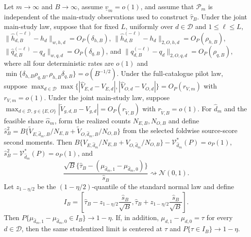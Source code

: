 Let \(m\to\infty\) and \(B\to\infty\), assume \(\underline v_m=o(1)\), and assume that \(\mathcal P_m\) is independent of the main-study observations used to construct \(\widehat\tau_B\). Under the joint main-study law, suppose that for fixed \(L\), uniformly over \(d\in\mathcal D\) and \(1\le\ell\le L\), \(\|\widehat h_{d,B}^{(-\ell)}-h_d\|_{w,h,d}=O_P(\delta_{h,B})\), \(\|\widehat h_{d,B}^{(-\ell)}-h_d\|_{2,O,h,d}=O_P(\rho_{h,B})\), \(\|\widehat q_{d,B}^{(-\ell)}-q_d\|_{w,q,d}=O_P(\delta_{q,B})\), and \(\|\widehat q_{d,B}^{(-\ell)}-q_d\|_{2,O,q,d}=O_P(\rho_{q,B})\), where all four deterministic rates are \(o(1)\) and \(\min\{\delta_{h,B}\rho_{q,B},\rho_{h,B}\delta_{q,B}\}=o(B^{-1/2})\). Under the full-catalogue pilot law, suppose \(\max_{d\in\mathcal D}\max\{|\widehat V_{E,d}-V_{E,d}|,|\widehat V_{O,d}-V_{O,d}|\}=O_P(r_{V,m})\) with \(r_{V,m}=o(1)\). Under the joint main-study law, suppose \(\max_{d\in\mathcal D,\,g\in\{E,O\}}|\widetilde V_{g,d,B}-V_{g,d}|=O_P(r_{\widetilde V,B})\) with \(r_{\widetilde V,B}=o(1)\). For \(\widehat d_m\) and the feasible share \(\widehat\alpha_m\), form the realized counts \(N_{E,B},N_{O,B}\) and define \(\widehat s_B^2=B\{\widetilde V_{E,\widehat d_m,B}/N_{E,B}+\widetilde V_{O,\widehat d_m,B}/N_{O,B}\}\) from the selected foldwise source-score second moments. Then \(B\{V_{E,\widehat d_m}/N_{E,B}+V_{O,\widehat d_m}/N_{O,B}\}-\mathcal V_{\widehat d_m}^*(P)=o_P(1)\), \(\widehat s_B^2-\mathcal V_{\widehat d_m}^*(P)=o_P(1)\), and
\[
 \frac{\sqrt B\{\widehat\tau_B-(\mu_{\widehat d_m,1}-\mu_{\widehat d_m,0})\}}
 {\widehat s_B}\rightsquigarrow\mathcal N(0,1).
\]
Let \(z_{1-\eta/2}\) be the \((1-\eta/2)\)-quantile of the standard normal law and define
\[
 I_B=\left[
 \widehat\tau_B-z_{1-\eta/2}\frac{\widehat s_B}{\sqrt B},
 \widehat\tau_B+z_{1-\eta/2}\frac{\widehat s_B}{\sqrt B}
 \right].
\]
Then \(P\{\mu_{\widehat d_m,1}-\mu_{\widehat d_m,0}\in I_B\}\to1-\eta\). If, in addition, \(\mu_{d,1}-\mu_{d,0}=\tau\) for every \(d\in\mathcal D\), then the same studentized limit is centered at \(\tau\) and \(P\{\tau\in I_B\}\to1-\eta\).